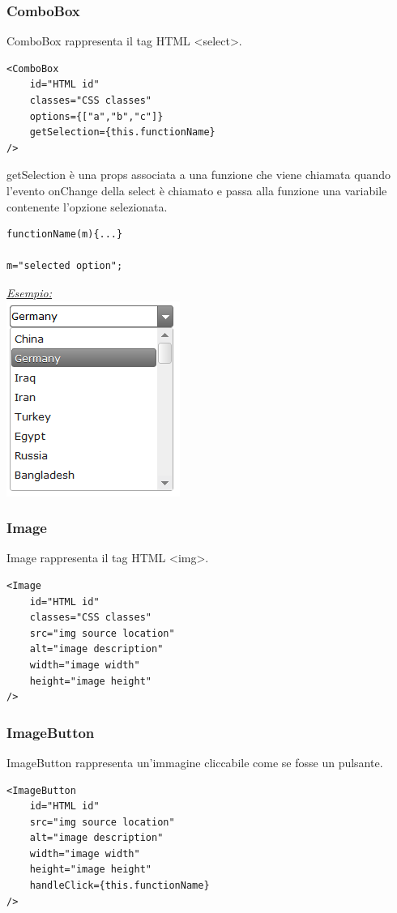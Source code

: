 \begin{flushleft}
\subsubsection{ComboBox}
ComboBox rappresenta il tag HTML <select>.
\begin{verbatim}
<ComboBox
	id="HTML id"
	classes="CSS classes"
	options={["a","b","c"]}
	getSelection={this.functionName}
/>
\end{verbatim}

getSelection è una props associata a una funzione che viene chiamata quando l'evento onChange della select è chiamato e passa alla funzione una variabile contenente l'opzione selezionata.

\begin{verbatim}
functionName(m){...}

m="selected option";
\end{verbatim}

\begin{center}

\underline{\textit{Esempio:}}
\\
\includegraphics[scale=0.9]{img/combobox.png}

\end{center}

\subsubsection{Image}
Image rappresenta il tag HTML <img>.

\begin{verbatim}
<Image
	id="HTML id"
	classes="CSS classes"
	src="img source location"
	alt="image description"
	width="image width"
	height="image height"
/>
\end{verbatim}

\subsubsection{ImageButton}
ImageButton rappresenta un'immagine cliccabile come se fosse un pulsante.
\begin{verbatim}
<ImageButton
	id="HTML id"
	src="img source location"
	alt="image description"
	width="image width"
	height="image height"
	handleClick={this.functionName}
/>
\end{verbatim}


\end{flushleft}
